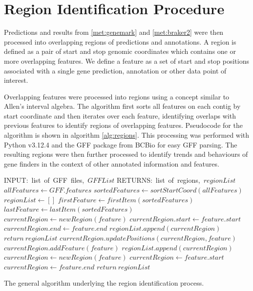 \section{Region Identification Procedure}
\label{section:region-met}

Predictions and results from \ref{met:genemark} and \ref{met:braker2}
were then processed into overlapping regions of predictions and
annotations. A region is defined as a pair of start and stop genomic
coordinates which contains one or more overlapping features. We define
a feature as a set of start and stop positions associated with a
single gene prediction, annotation or other data point of interest.

Overlapping features were processed into regions using a concept
similar to Allen's interval algebra\cite{DECHTER2003333}. The
algorithm first sorts all features on each contig by start coordinate
and then iterates over each feature, identifying overlaps with
previous features to identify regions of overlapping
features. Pseudocode for the algorithm is shown in algorithm
\ref{alg:regions}. This processing was performed with Python
v3.12.4\cite{Foundation} and the GFF package from BCBio\cite{Chapman}
for easy GFF parsing.  The resulting regions were then further
processed to identify trends and behaviours of gene finders in the
context of other annotated information and features.

\begin{algorithm}
  \begin{algorithmic}
    \State INPUT:\ list\ of\ GFF\ files,\ $GFFList$
    \State RETURNS:\ list\ of\ regions,\ $regionList$
    \State $allFeatures \gets GFF.features$
    \EndFor
    \State $sortedFeatures \gets sortStartCoord(allFeatures)$
    \State $regionList \gets []$
    \State $firstFeature \gets firstItem(sortedFeatures)$
    \State $lastFeature \gets lastItem(sortedFeatures)$
        \State $currentRegion \gets newRegion(feature)$
        \State $currentRegion.start \gets feature.start$
        \State $currentRegion.end \gets feature.end$
        \State $regionList.append(currentRegion)$
        \State $return\ regionList$
        \State $currentRegion.updatePositions(currentRegion, feature)$
        \State $currentRegion.addFeature(feature)$
      \Else
        \State $regionList.append(currentRegion)$
        \State $currentRegion \gets newRegion(feature)$
        \State $currentRegion \gets feature.start$
        \State $currentRegion \gets feature.end$
      \EndIf
    \EndFor
    \State $return\ regionList$
  \end{algorithmic}
  \caption{The general algorithm underlying the region identification
    process.}
  \label{alg:regions}
\end{algorithm}

